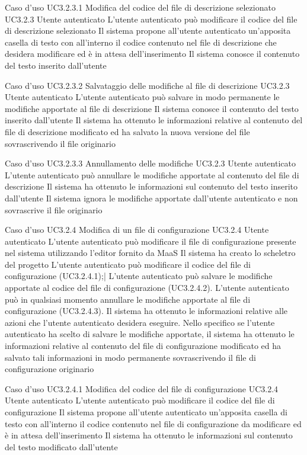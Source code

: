 \UCtitle
{Caso d'uso UC3.2.3.1}
{Modifica del codice del file di descrizione selezionato}
\UC
{UC3.2.3}
{Utente autenticato}
{L'utente autenticato può modificare il codice del file di descrizione selezionato}
{Il sistema propone all'utente autenticato un'apposita casella di testo con all'interno il codice contenuto nel file di descrizione che desidera modificare ed è in attesa dell'inserimento}
\post
{Il sistema conosce il contenuto del testo inserito dall'utente}

\UCtitle
{Caso d'uso UC3.2.3.2}
{Salvataggio delle modifiche al file di descrizione}
\UC
{UC3.2.3}
{Utente autenticato}
{L'utente autenticato può salvare in modo permanente le modifiche apportate al file di descrizione}
{Il sistema conosce il contenuto del testo inserito dall'utente}
\post
{Il sistema ha ottenuto le informazioni relative al contenuto del file di descrizione modificato ed ha salvato la nuova versione del file sovrascrivendo il file originario}

\UCtitle
{Caso d'uso UC3.2.3.3}
{Annullamento delle modifiche}
\UC
{UC3.2.3}
{Utente autenticato}
{L'utente autenticato può annullare le modifiche apportate al contenuto del file di descrizione}
{Il sistema ha ottenuto le informazioni sul contenuto del testo inserito dall'utente}
\post
{Il sistema ignora le modifiche apportate dall'utente autenticato e non sovrascrive il file originario}


\UCtitle
{Caso d'uso UC3.2.4}
{Modifica di un file di configurazione}
\UC
{UC3.2.4}
{Utente autenticato}
{L'utente autenticato può modificare il file di configurazione presente nel sistema utilizzando l'editor fornito da MaaS}
{Il sistema ha creato lo scheletro del progetto}
\scenario
{L'utente autenticato può modificare il codice del file di configurazione (UC3.2.4.1);|
L'utente autenticato può salvare le modifiche apportate al codice del file di configurazione (UC3.2.4.2).
}
\estensioni
{L'utente autenticato può in qualsiasi momento annullare le modifiche apportate al file di configurazione (UC3.2.4.3).}
\post
{Il sistema ha ottenuto le informazioni relative alle azioni che l'utente autenticato desidera eseguire. Nello specifico se l'utente autenticato ha scelto di salvare le modifiche apportate, il sistema ha ottenuto le informazioni relative al contenuto del file di configurazione modificato ed ha salvato tali informazioni in modo permanente sovrascrivendo il file di configurazione originario}

\UCtitle
{Caso d'uso UC3.2.4.1}
{Modifica del codice del file di configurazione}
\UC
{UC3.2.4}
{Utente autenticato}
{L'utente autenticato può modificare il codice del file di configurazione}
{Il sistema propone all'utente autenticato un'apposita casella di testo con all'interno il codice contenuto nel file di configurazione da modificare ed è in attesa dell'inserimento}
\post
{Il sistema ha ottenuto le informazioni sul contenuto del testo modificato dall'utente}

